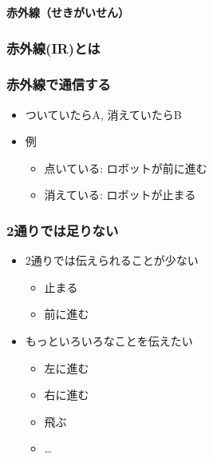 \begin{frame}[plain]
    \begin{center}
        \vspace{48pt}
        {\huge\bf 赤外線（せきがいせん）}
    \end{center}
\end{frame}

\begin{frame}[fragile]
    \frametitle{赤外線(IR)とは}
    \vspace{20pt}
    \begin{center}
        
    \end{center}
\end{frame}

\begin{frame}
    \frametitle{赤外線で通信する}
    \begin{itemize}
        \item ついていたらA, 消えていたらB
        \item 例
        \begin{itemize}
            \item 点いている: ロボットが前に進む
            \item 消えている: ロボットが止まる
        \end{itemize}
    \end{itemize}
\end{frame}

\begin{frame}
   \frametitle{2通りでは足りない} 
   \begin{itemize}
        \item 2通りでは伝えられることが少ない
        \begin{itemize}
            \item 止まる
            \item 前に進む
        \end{itemize}
        \item もっといろいろなことを伝えたい
        \begin{itemize}
            \item 左に進む
            \item 右に進む
            \item 飛ぶ
            \item \dots
        \end{itemize}
   \end{itemize}
\end{frame}


